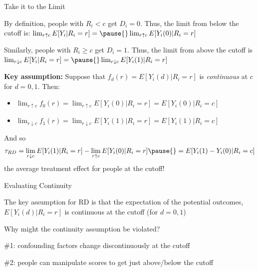 \documentclass[11pt,english,handout]{beamer}
\newenvironment{wideitemize}{\itemize\addtolength{\itemsep}{10pt}}{\enditemize}
\begin{document}
\begin{frame}{Take it to the Limit}
\begin{wideitemize}
	\item
	By definition, people with $R_i < c$ get $D_i = 0$. Thus, the limit from below the cutoff is:
	$\lim_{r \uparrow c} E[Y_{i} | R_i = r] = \pause{}  \lim_{r \uparrow c} E[Y_{i}(0) | R_i = r]$
	
	\pause
	\item 
	Similarly, people with $R_i \geq c$ get $D_i =1$. Thus, the limit from above the cutoff is
	$\lim_{r \downarrow c} E[Y_{i} | R_i = r] = \pause{} \lim_{r \downarrow c} E[Y_{i}(1) | R_i = r]$
	
	\pause
	\item
	\textbf{Key assumption:} Suppose that $f_d(r)=E[Y_{i}(d) | R_i = r]$ is \textit{continuous} at $c$ for $d= 0,1$. Then:
	\smallskip\pause{}
	\begin{itemize}
	\item $\lim_{r \uparrow c}f_0(r)=\lim_{r \uparrow c} E[Y_{i}(0) | R_i = r]=E[Y_{i}(0) | R_i = c]$\smallskip\pause{}
	\item $\lim_{r \downarrow c}f_1(r)=\lim_{r \downarrow c} E[Y_{i}(1) | R_i = r]=E[Y_{i}(1) | R_i = c]$
	\end{itemize}
	\pause
	\item
	And so
	$$\tau_{RD} =\lim_{r \downarrow c} E[Y_{i}(1) | R_i = r]- \lim_{r \uparrow c} E[Y_{i}(0) | R_i = r]\pause{} = E [Y_{i}(1) - Y_{i}(0) | R_i = c] $$
	\pause the average treatment effect for people at the cutoff!
\end{wideitemize}

\end{frame} 


\begin{frame}{Evaluating Continuity}
	\begin{wideitemize}
		\item
		The key assumption for RD is that the expectation of the potential outcomes, $E[Y_i(d) | R_i = r]$ is continuous at the cutoff (for $d=0,1$)
		
		\pause
		\item
		Why might the continuity assumption be violated?
		
		\pause
		\item
		\#1: confounding factors change discontinuously at the cutoff
		
		\pause
		\item
		\#2: people can manipulate scores to get just above/below the cutoff
		
	\end{wideitemize}
\end{frame}	
\end{document}
